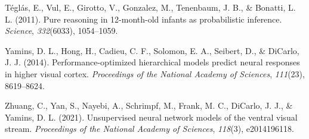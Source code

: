\documentclass[10pt, letterpaper]{article}
\newenvironment{CSLReferences}%
  {}%
  {\par}
\begin{document}
\begin{CSLReferences}{1}{0}
\leavevmode{}%
Téglás, E., Vul, E., Girotto, V., Gonzalez, M., Tenenbaum, J. B., \&
Bonatti, L. L. (2011). Pure reasoning in 12-month-old infants as
probabilistic inference. \emph{Science}, \emph{332}(6033), 1054--1059.

\leavevmode{}%
Yamins, D. L., Hong, H., Cadieu, C. F., Solomon, E. A., Seibert, D., \&
DiCarlo, J. J. (2014). Performance-optimized hierarchical models predict
neural responses in higher visual cortex. \emph{Proceedings of the
National Academy of Sciences}, \emph{111}(23), 8619--8624.

\leavevmode{}%
Zhuang, C., Yan, S., Nayebi, A., Schrimpf, M., Frank, M. C., DiCarlo, J.
J., \& Yamins, D. L. (2021). Unsupervised neural network models of the
ventral visual stream. \emph{Proceedings of the National Academy of
Sciences}, \emph{118}(3), e2014196118.

\end{CSLReferences}


\end{document}
